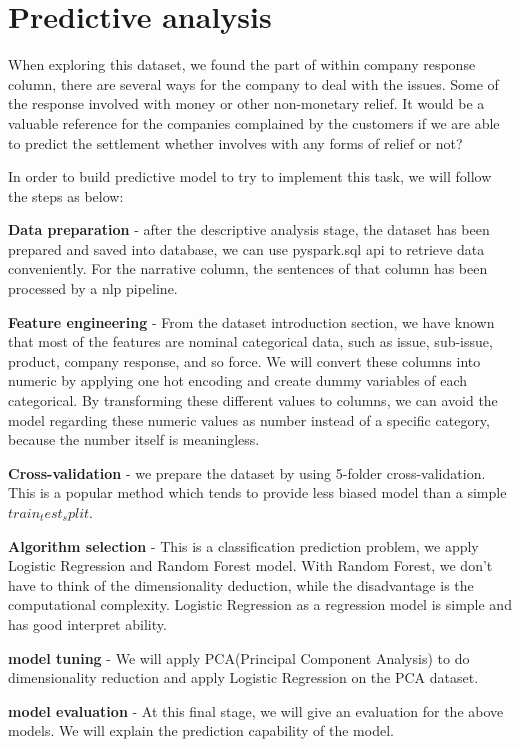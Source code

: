 \documentclass[conference]{IEEEtran}
\begin{document}
\section{Predictive analysis }
When exploring this dataset, we found the part of within company response column, there are several ways for the company to deal with the issues. Some of the response involved with money or other non-monetary relief. It would be a valuable reference for the companies complained by the customers if we are able to predict the settlement whether involves with any forms of relief or not? 

In order to build predictive model to try to implement this task, we will follow the steps as below:
 
\textbf{Data preparation} - after the descriptive analysis stage, the dataset has been prepared and saved into database, we can use pyspark.sql api to retrieve data conveniently. For the narrative column, the sentences of that column has been processed by a nlp pipeline. 
 
\textbf{Feature engineering} - From the dataset introduction section, we have known that most of the features are nominal categorical data, such as issue, sub-issue, product, company response, and so force. We will convert these columns into numeric by applying one hot encoding and  create dummy variables of each categorical. By transforming these different values to columns, we can avoid the model regarding these numeric values as number instead of a specific category, because the number itself is meaningless\cite{feature_engineering}.


\textbf{Cross-validation} - we prepare the dataset by using 5-folder cross-validation. This is a popular method which tends to provide less biased model than a simple $train_test_split$.

\textbf{Algorithm selection} - This is a classification prediction problem, we apply Logistic Regression and Random Forest model. With Random Forest, we don't have to think of the dimensionality deduction, while the disadvantage is the computational complexity. Logistic Regression as a regression model is simple and has good interpret ability.

\textbf{model tuning} - We will apply PCA(Principal Component Analysis) to do dimensionality reduction and apply Logistic Regression on the PCA dataset.

\textbf{model evaluation} - At this final stage, we will give an evaluation for the above models. We will explain the prediction capability of the model.
\end{document}
